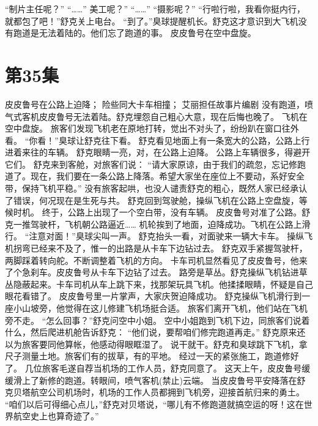 \documentclass[a4paper,12pt,UTF8,twoside]{ctexbook}
\begin{document}
        “制片主任呢？” 
        “……” 
        美工呢？” 
        “……” 
        “摄影呢？” 
        “行啦行啦，我看你挺内行，就都包了吧！”舒克关上电台。 
        “到了。”臭球提醒机长。舒克这才意识到大飞机没有跑道是无法着陆的。他们忘了跑道的事。 
        皮皮鲁号在空中盘旋。   \chapter{第35集} 
        皮皮鲁号在公路上迫降； 
        险些同大卡车相撞； 
        艾丽担任故事片编剧   
        没有跑道，喷气式客机皮皮鲁号无法着陆。舒克埋怨自己粗心大意，现在后悔也晚了。 
        飞机在空中盘旋。 
        旅客们发现飞机老在原地打转，觉出不对头了，纷纷趴在窗口往外看。 
        “你看！”臭球让舒克往下看。 
        舒克看见地面上有一条宽大的公路，公路上行进着来往的车辆。 
        舒克眼睛一亮，对，在公路上迫降。 
        公路上车辆很多，得避开它们。 
        舒克来到客舱，对旅客们说： 
        “请大家原谅，由于我们的疏忽，忘记修跑道了。现在，我们要在一条公路上降落。希望大家坐在座位上不要动，系好安全带，保持飞机平稳。” 
        没有旅客起哄，也没人谴责舒克的粗心，既然人家已经承认了错误，何况现在是生死与共。 
        舒克回到驾驶舱，操纵飞机在公路上空盘旋，等候时机。 
        终于，公路上出现了一个空白带，没有车辆。 
        皮皮鲁号对准了公路。舒克一推驾驶杆，飞机朝公路逼近…… 
        机轮挨到了地面，迫降成功。飞机在公路上滑行。 
        “注意对面！”臭球尖叫一声。 
        舒克抬头一看，对面驶来一辆大卡车。 
        操纵飞机拐弯已经来不及了，惟一的出路是从卡车下边钻过去。 
        舒克双手紧握驾驶杆，两脚踩着转向舵。不断调整着飞机的方向。 
        卡车司机显然看见了皮皮鲁号，他来了个急刹车。皮皮鲁号从卡车下边钻了过去。 
        路旁是草丛。舒克操纵飞机钻进草丛隐蔽起来。卡车司机从车上跳下来，找那架玩具飞机。他揉揉眼睛，怀疑是自己眼花看错了。 
        皮皮鲁号里一片掌声，大家庆贺迫降成功。 
        舒克操纵飞机滑行到一座小山坡旁，他觉得在这儿修建飞机场挺合适。 
        旅客们离开飞机，他们站在飞机旁不走。 
        “怎么回事？”舒克问空中小姐。 
        空中小姐跑到飞机下边，同旅客们说着什么，然后爬进机舱告诉舒克： 
        “他们说，要帮咱们修完跑道再走。” 
        舒克原来还以为旅客要同他算帐，他感动得眼眶湿了。 
        说干就干。舒克和臭球跳下飞机，拿尺子测量土地。旅客们有的拔草，有的平地。 
        经过一天的紧张施工，跑道修好了。 
        几位旅客毛遂自荐当机场的工作人员，舒克同意了。 
        这天上午，皮皮鲁号缓缓滑上了新修的跑道。转眼间，喷气客机(禁止)云端。 
        当皮皮鲁号平安降落在舒克贝塔航空公司机场时，机场的工作人员都拥到飞机旁，迎接首航归来的勇土。 
        “咱们以后可得细心点儿，”舒克对贝塔说，“哪儿有不修跑道就搞空运的呀！这在世界航空史上也算奇迹了。” 
\end{document}
